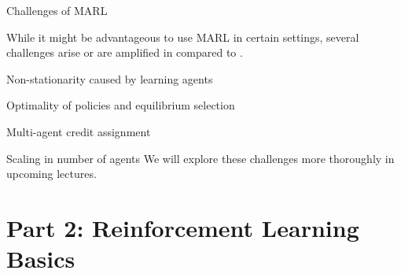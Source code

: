 \begin{frame}{Challenges of MARL}

    While it might be advantageous to use MARL in certain settings, several challenges arise or are amplified in  compared to .
    \vspace{10pt}
    \blist
        \item Non-stationarity caused by learning agents
        \item Optimality of policies and equilibrium selection
        \item Multi-agent credit assignment
        \item Scaling in number of agents
    \elist
    \vspace{10pt}
    We will explore these challenges more thoroughly in upcoming lectures. 
    
\end{frame}


    

\section{Part 2: Reinforcement Learning Basics}


